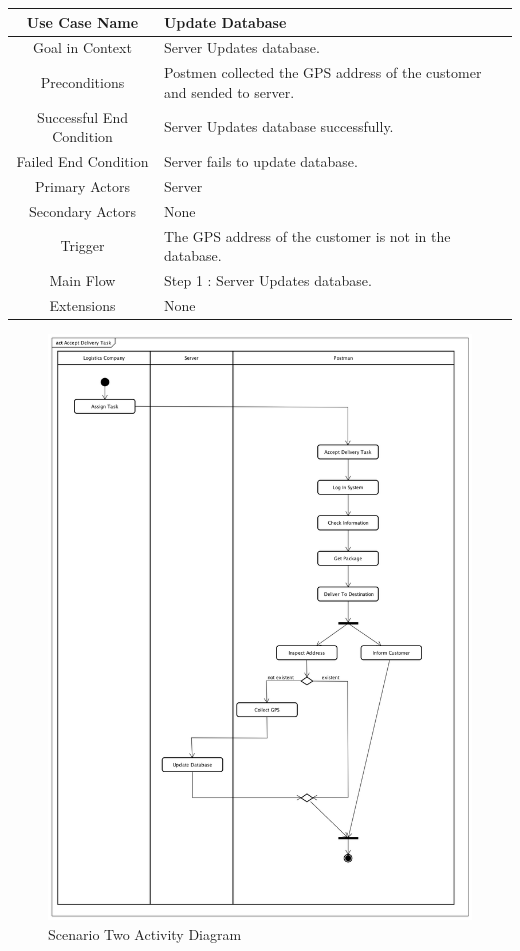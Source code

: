 \documentclass[12pt]{scrreprt}
\begin{document}
\begin{table}
  \centering
  \begin{tabular}{| c | p{11cm} |}
    \hline
    Use Case Name & Update Database\\
    \hline
    Goal in Context & Server Updates database.\\
    \hline
    Preconditions & Postmen collected the GPS address of  the customer and
    sended to server.\\
    \hline
    Successful End Condition & Server Updates database successfully.\\
    \hline
    Failed End Condition & Server fails to update database.\\
    \hline
    Primary Actors & Server\\
    \hline
    Secondary Actors & None\\
    \hline
    Trigger & The GPS address of  the customer is not in the database.\\
    \hline
    Main Flow & Step 1 : Server Updates database.\\
    \hline
    Extensions & None\\
    \hline
  \end{tabular}
\end{table}

\begin{figure}[H]
  \centering\includegraphics[width=5in]{DocumentRes/2ActivityDiagram.png}
  \caption{Scenario Two Activity Diagram}
\end{figure}
\end{document}
